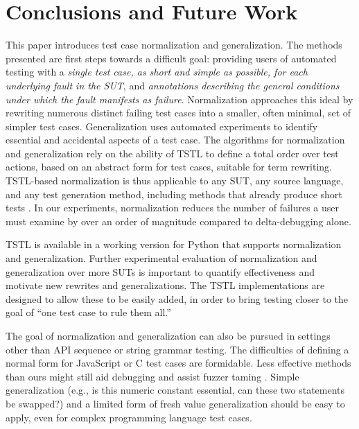 \section{Conclusions and Future Work}

This paper introduces test case normalization and generalization.  The
methods presented are first steps towards a difficult goal: providing
users of automated testing with a \emph{single test case, as short and
  simple as possible, for each underlying fault in the SUT}, and
\emph{annotations describing the general conditions under which the
  fault manifests as failure}.  Normalization approaches this ideal by
rewriting numerous distinct failing test cases into a smaller, often
minimal, set of simpler test cases.  Generalization uses
automated experiments to identify essential and accidental aspects of
a test case.  The algorithms for normalization and generalization rely
on the ability of TSTL \cite{NFM15,ISSTA15} to define a total order
over test actions, based on an abstract form for test cases, suitable
for term rewriting.  TSTL-based normalization is thus applicable to
any SUT, any source language, and any test generation method,
including methods that already produce short tests
\cite{FA11,SoftBET}.  In our experiments, normalization reduces the
number of failures a user must examine by over an order of magnitude
compared to delta-debugging alone.

TSTL is available in a working version for Python \cite{tstl} that
supports normalization and generalization.  Further experimental
evaluation of normalization and generalization over more SUTs is
important to quantify effectiveness and motivate new rewrites and
generalizations.  The TSTL implementations are designed to allow these
to be easily added, in order to bring testing closer to the
goal of ``one test case to rule them all.''

 The goal of normalization and generalization can also be pursued in
settings other than API sequence or string grammar testing.  The
difficulties of defining a normal form for JavaScript \cite{jsfunfuzz}
or C \cite{CReduce} test cases are formidable. Less effective methods
than ours might still aid debugging and assist fuzzer taming
\cite{PLDI13}.  Simple generalization (e.g., is this numeric constant
essential, can these two statements be swapped?) and a limited form of
fresh value generalization should be easy to apply, even for complex
programming language test cases.  